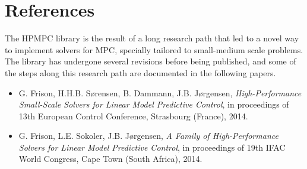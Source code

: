 \documentclass[a4paper]{report}
\begin{document}
\chapter{References}

The HPMPC library is the result of a long research path that led to a novel way to implement solvers for MPC, specially tailored to small-medium scale problems.
The library has undergone several revisions before being published, and some of the steps along this research path are documented in the following papers.
\begin{itemize}
\item G. Frison, H.H.B. S{\o}rensen, B. Dammann, J.B. J{\o}rgensen, \emph{ High-Performance Small-Scale Solvers for Linear Model Predictive Control}, in proceedings of 13th European Control Conference, Strasbourg (France), 2014.
\item G. Frison, L.E. Sokoler, J.B. J{\o}rgensen, \emph{A Family of High-Performance Solvers for Linear Model Predictive Control}, in proceedings of 19th IFAC World Congress, Cape Town (South Africa), 2014.
\end{itemize}
\end{document}
